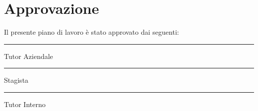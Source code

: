 \section{Approvazione}
Il presente piano di lavoro è stato approvato dai seguenti:

\vspace{2cm}
 \hrule width 9cm height 0.4pt depth 0pt \vspace{0.2cm}
\noindent \Greg \hspace{3cm} Tutor Aziendale

\vspace{2cm}
 \hrule width 9cm height 0.4pt depth 0pt \vspace{0.2cm}
\noindent \myName \hspace{3cm} Stagista

\vspace{2cm}
 \hrule width 9cm height 0.4pt depth 0pt \vspace{0.2cm}
\noindent \myProf \hspace{2.7cm} Tutor Interno